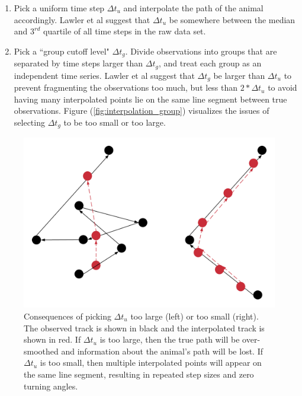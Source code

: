 \begin{enumerate}
	\item Pick a uniform time step $\Delta t_u$ and interpolate the path of the animal accordingly. Lawler et al suggest that $\Delta t_u$ be somewhere between the median and $3^{rd}$ quartile of all time steps in the raw data set. 
	\item Pick a ``group cutoff level" $\Delta t_g$. Divide observations into groups that are separated by time steps larger than $\Delta t_g$, and treat each group as an independent time series. Lawler et al suggest that $\Delta t_g$ be larger than $\Delta t_u$ to prevent fragmenting the observations too much, but less than $2*\Delta t_u$ to avoid having many interpolated points lie on the same line segment between true observations. Figure (\ref{fig:interpolation_group}) visualizes the issues of selecting $\Delta t_g$ to be too small or too large.
\end{enumerate} 

\begin{figure}[h!]
	\centering
	\includegraphics[height=3in]{../Plots/Interpolation.png}
	\caption{Consequences of picking $\Delta t_u$ too large (left) or too small (right). The observed track is shown in black and the interpolated track is shown in red. If $\Delta t_u$ is too large, then the true path will be over-smoothed and information about the animal's path will be lost. If $\Delta t_u$ is too small, then multiple interpolated points will appear on the same line segment, resulting in repeated step sizes and zero turning angles.}
	\label{fig:interpolation}
\end{figure}

